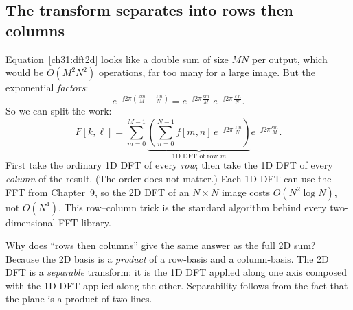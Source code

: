 \subsection{The transform separates into rows then columns}
\label{ch31:separable-dft}
Equation~\eqref{ch31:dft2d} looks like a double sum of size $MN$ per output, which
would be $O(M^2N^2)$ operations, far too many for a large image. But the exponential \emph{factors}:
\[
e^{-\jj 2\pi(\frac{km}{M}+\frac{\ell n}{N})}
= e^{-\jj 2\pi \frac{km}{M}}\; e^{-\jj 2\pi \frac{\ell n}{N}}.
\]
So we can split the work:
\begin{equation}
F[k,\ell] = \sum_{m=0}^{M-1}\underbrace{\left(\sum_{n=0}^{N-1}
f[m,n]\,e^{-\jj 2\pi \frac{\ell n}{N}}\right)}_{\text{1D DFT of row } m}
e^{-\jj 2\pi \frac{km}{M}}.
\label{ch31:rowcol}
\end{equation}
First take the ordinary 1D DFT of every \emph{row}; then take the 1D DFT of every
\emph{column} of the result. (The order does not matter.) Each 1D DFT can use the
FFT from Chapter~9, so the 2D DFT of an $N\times N$ image costs $O(N^2\log N)$, not
$O(N^4)$. This row--column trick is the standard algorithm behind every two-dimensional
FFT library.
\begin{whybox}
Why does ``rows then columns'' give the same answer as the full 2D sum? Because the
2D basis is a \emph{product} of a row-basis and a column-basis. The 2D DFT is a
\emph{separable} transform: it is the 1D DFT applied along one axis composed with
the 1D DFT applied along the other. Separability follows from
the fact that the plane is a product of two lines.
\end{whybox}
